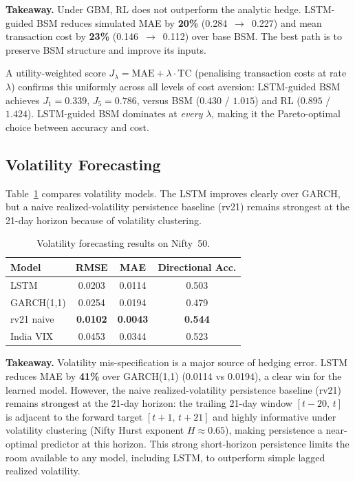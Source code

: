 \documentclass[10pt,a4paper]{article}
\begin{document}
\textbf{Takeaway.} Under GBM, RL does not outperform the analytic hedge.
LSTM-guided BSM reduces simulated MAE by \textbf{20\%} (0.284~$\to$~0.227) and
mean transaction cost by \textbf{23\%} (0.146~$\to$~0.112) over base BSM.
The best path is to preserve BSM structure and improve its inputs.

A utility-weighted score $J_\lambda = \text{MAE} + \lambda\cdot\text{TC}$ (penalising
transaction costs at rate $\lambda$) confirms this uniformly across all levels of
cost aversion: LSTM-guided BSM achieves $J_1=\mathbf{0.339}$, $J_5=\mathbf{0.786}$,
versus BSM ($0.430$ / $1.015$) and RL ($0.895$ / $1.424$).  LSTM-guided BSM
dominates at \emph{every} $\lambda$, making it the Pareto-optimal choice between
accuracy and cost.

\subsection*{Volatility Forecasting}
Table~\ref{tab:vol} compares volatility models. The LSTM improves clearly over
GARCH, but a naive realized-volatility persistence baseline (rv21) remains
strongest at the 21-day horizon because of volatility clustering.

\begin{table}[H]
\centering
\caption{Volatility forecasting results on Nifty~50.}
\label{tab:vol}
\begin{tabular}{lccc}
\toprule
Model & RMSE & MAE & Directional Acc. \\
\midrule
LSTM        & 0.0203 & 0.0114 & 0.503 \\
GARCH(1,1) \cite{Bollerslev1986} & 0.0254 & 0.0194 & 0.479 \\
rv21 naive  & \textbf{0.0102} & \textbf{0.0043} & \textbf{0.544} \\
India VIX   & 0.0453 & 0.0344 & 0.523 \\
\bottomrule
\end{tabular}
\end{table}

\textbf{Takeaway.} Volatility mis-specification is a major source of hedging
error. LSTM reduces MAE by \textbf{41\%} over GARCH(1,1) (0.0114 vs 0.0194),
a clear win for the learned model. However, the naive realized-volatility
persistence baseline (rv21) remains strongest at the 21-day horizon: the
trailing 21-day window $[t\!-\!20,\,t]$ is adjacent to the forward target
$[t\!+\!1,\,t\!+\!21]$ and highly informative under volatility clustering
(Nifty Hurst exponent $H\approx0.65$), making persistence a near-optimal
predictor at this horizon.  This strong short-horizon persistence limits
the room available to any model, including LSTM, to outperform simple
lagged realized volatility.
\end{document}
